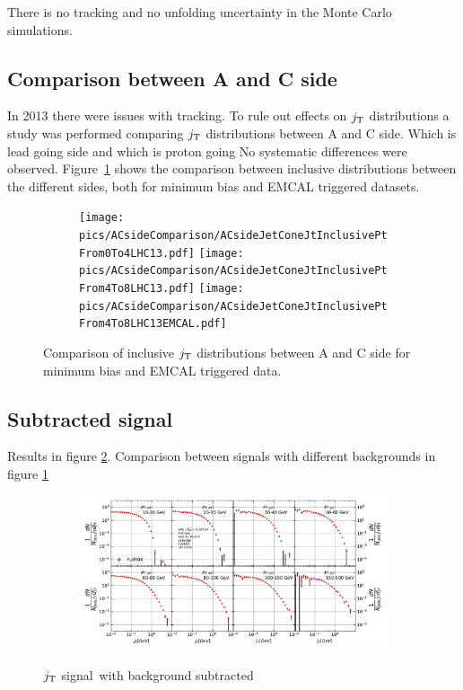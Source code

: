 There is no tracking and no unfolding uncertainty in the Monte Carlo simulations. 



\subsection{Comparison between A and C side}
In 2013 there were issues with tracking. To rule out effects on $j_{\rm T}$ distributions a study was performed comparing $j_{\rm T}$ distributions between A and C side. {\color{red}Which is lead going side and which is proton going} No systematic differences were observed. Figure~\ref{fig:signalbg} shows the comparison between inclusive distributions between the different sides, both for minimum bias and EMCAL triggered datasets.

\begin{figure}
\centering
\begin{subfigure}{0.95\textwidth}
\texttt{[image: pics/ACsideComparison/ACsideJetConeJtInclusivePtFrom0To4LHC13.pdf]}
\texttt{[image: pics/ACsideComparison/ACsideJetConeJtInclusivePtFrom4To8LHC13.pdf]}
\texttt{[image: pics/ACsideComparison/ACsideJetConeJtInclusivePtFrom4To8LHC13EMCAL.pdf]}
\end{subfigure}
\caption{Comparison of inclusive $j_{\rm T}$ distributions between A and C side for minimum bias and EMCAL triggered data.}
\label{fig:signalbg}
\end{figure}

\subsection{Subtracted signal}
Results in figure \ref{fig:signal}. Comparison between signals with different backgrounds in figure \ref{fig:signalbg}
\begin{figure}
\centering
\begin{subfigure}{0.95\textwidth}
\includegraphics[width=\textwidth]{results/MixedFullJetsR04JetConeJtSignal.pdf}
\end{subfigure}
\caption{$j_{\rm T}$ signal with background subtracted}
\label{fig:signal}
\end{figure}

